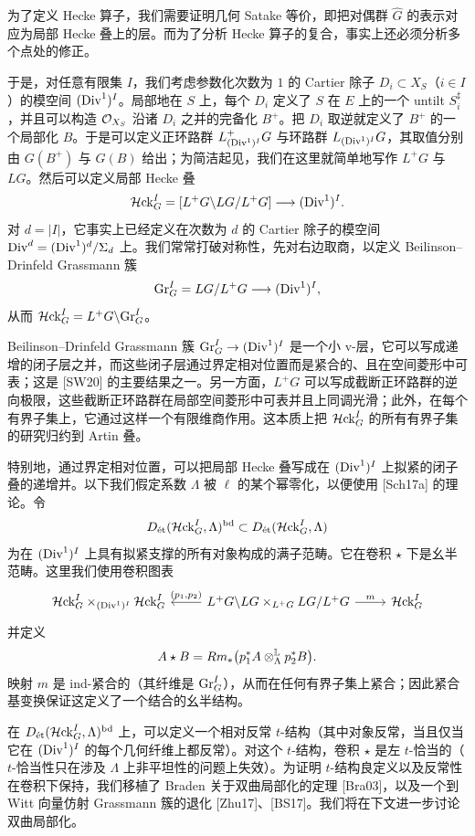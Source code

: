 为了定义 Hecke 算子，我们需要证明几何 Satake 等价，即把对偶群 $\hat G$ 的表示对应为局部 Hecke 叠上的层。而为了分析 Hecke 算子的复合，事实上还必须分析多个点处的修正。

于是，对任意有限集 $I$，我们考虑参数化次数为 $1$ 的 Cartier 除子 $D_i\subset X_S$（$i\in I$）的模空间 $(\mathrm{Div}^1)^I$。局部地在 $S$ 上，每个 $D_i$ 定义了 $S$ 在 $E$ 上的一个 untilt $S_i^\sharp$，并且可以构造 $\mathcal{O}_{X_S}$ 沿诸 $D_i$ 之并的完备化 $B^+$。把 $D_i$ 取逆就定义了 $B^+$ 的一个局部化 $B$。于是可以定义正环路群 $L^+_{(\mathrm{Div}^1)^I}G$ 与环路群 $L_{(\mathrm{Div}^1)^I}G$，其取值分别由 $G(B^+)$ 与 $G(B)$ 给出；为简洁起见，我们在这里就简单地写作 $L^+G$ 与 $LG$。然后可以定义局部 Hecke 叠
\[
\mathcal{H}\mathrm{ck}^I_G=[L^+G\backslash LG/L^+G]\longrightarrow(\mathrm{Div}^1)^I.
\]
对 $d=|I|$，它事实上已经定义在次数为 $d$ 的 Cartier 除子的模空间 $\mathrm{Div}^d=(\mathrm{Div}^1)^d/\Sigma_d$ 上。我们常常打破对称性，先对右边取商，以定义 Beilinson–Drinfeld Grassmann 簇
\[
\mathrm{Gr}^I_G=LG/L^+G\longrightarrow(\mathrm{Div}^1)^I,
\]
从而 $\mathcal{H}\mathrm{ck}^I_G=L^+G\backslash\mathrm{Gr}^I_G$。

Beilinson–Drinfeld Grassmann 簇 $\mathrm{Gr}^I_G\to(\mathrm{Div}^1)^I$ 是一个小 v-层，它可以写成递增的闭子层之并，而这些闭子层通过界定相对位置而是紧合的、且在空间菱形中可表；这是 [SW20] 的主要结果之一。另一方面，$L^+G$ 可以写成截断正环路群的逆向极限，这些截断正环路群在局部空间菱形中可表并且上同调光滑；此外，在每个有界子集上，它通过这样一个有限维商作用。这本质上把 $\mathcal{H}\mathrm{ck}^I_G$ 的所有有界子集的研究归约到 Artin 叠。

特别地，通过界定相对位置，可以把局部 Hecke 叠写成在 $(\mathrm{Div}^1)^I$ 上拟紧的闭子叠的递增并。以下我们假定系数 $\Lambda$ 被 $\ell$ 的某个幂零化，以便使用 [Sch17a] 的理论。令
\[
D_{\text{\'et}}(\mathcal{H}\mathrm{ck}^I_G,\Lambda)^{\mathrm{bd}}\subset D_{\text{\'et}}(\mathcal{H}\mathrm{ck}^I_G,\Lambda)
\]
为在 $(\mathrm{Div}^1)^I$ 上具有拟紧支撑的所有对象构成的满子范畴。它在卷积 $\star$ 下是幺半范畴。这里我们使用卷积图表
\[
\begin{tikzcd}
\fsHck^I_G\times_{(\Div^1)^I}\fsHck^I_G & L^+G\backslash LG\times_{L^+G}LG/L^+G \arrow[l,"{(p_1,p_2)}"'] \arrow[r,"m"] & \fsHck^I_G
\end{tikzcd}
\]
并定义
\[
A\star B=Rm_*\bigl(p_1^*A\otimes^{\mathbb{L}}_{\Lambda}p_2^*B\bigr).
\]
映射 $m$ 是 ind-紧合的（其纤维是 $\mathrm{Gr}^I_G$），从而在任何有界子集上紧合；因此紧合基变换保证这定义了一个结合的幺半结构。

在 $D_{\text{\'et}}(\mathcal{H}\mathrm{ck}^I_G,\Lambda)^{\mathrm{bd}}$ 上，可以定义一个相对反常 $t$-结构（其中对象反常，当且仅当它在 $(\mathrm{Div}^1)^I$ 的每个几何纤维上都反常）。对这个 $t$-结构，卷积 $\star$ 是左 $t$-恰当的（$t$-恰当性只在涉及 $\Lambda$ 上非平坦性的问题上失效）。为证明 $t$-结构良定义以及反常性在卷积下保持，我们移植了 Braden 关于双曲局部化的定理 [Bra03]，以及一个到 Witt 向量仿射 Grassmann 簇的退化 [Zhu17]、[BS17]。我们将在下文进一步讨论双曲局部化。

